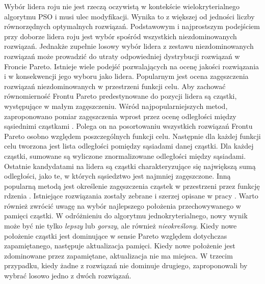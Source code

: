 Wybór lidera roju nie jest rzeczą oczywistą w kontekście wielokryterialnego algorytmu PSO i musi ulec modyfikacji. Wynika to z większej od jedności liczby równorzędnych optymalnych rozwiązań. Podstawowym i najprostszym podejściem przy doborze lidera roju jest wybór spośród wszystkich niezdominowanych rozwiązań. Jednakże zupełnie losowy wybór lidera z zestawu niezdominowanych rozwiązań może prowadzić do utraty odpowiedniej dystrybucji rozwiązań w Froncie Pareto. Istnieje wiele podejść pozwalających na ocenę jakości rozwiązania i w konsekwencji jego wyboru jako lidera. Popularnym jest ocena zagęszczenia rozwiązań niezdominowanych w przestrzeni funkcji celu. Aby zachować równomierność Frontu Pareto predestynowane do pozycji lidera są cząstki, występujące w małym zagęszczeniu. Wśród najpopularniejszych metod, zaproponowano pomiar zagęszczenia wprost przez ocenę odległości między sąsiednimi cząstkami \parencite{Deb2002}. Polega on na posortowaniu wszystkich rozwiązań Frontu Pareto osobno względem poszczególnych funkcji celu. Następnie dla każdej funkcji celu tworzona jest lista odległości pomiędzy sąsiadami danej cząstki. Dla każdej cząstki, sumowane są wyliczone znormalizowane odległości między sąsiadami. Ostatnie kandydatami na lidera są cząstki charakteryzujące się największą sumą odległości, jako te, w których sąsiedztwo jest najmniej zagęszczone. Inną popularną metodą jest określenie zagęszczenia cząstek w przestrzeni przez funkcję rdzenia \parencite{Deb1989}. Istniejące rozwiązania zostały zebrane i szerzej opisane w pracy \parencite{CoelloCoello2006}. Warto również zwrócić uwagę na wybór najlepszego położenia przechowywanego w pamięci cząstki. W odróżnieniu do algorytmu jednokryterialnego, nowy wynik może być nie tylko \textit{lepszy} lub \textit{gorszy}, ale również \textit{nieokreślony}. Kiedy nowe położenie cząstki jest dominujące w sensie Pareto względem dotychczas zapamiętanego, następuje aktualizacja pamięci. Kiedy nowe położenie jest zdominowane przez zapamiętane, aktualizacja nie ma miejsca. W trzecim przypadku, kiedy żadne z rozwiązań nie dominuje drugiego, \cite{CoelloCoello2002} zaproponowali by wybrać losowo jedno z dwóch rozwiązań.


